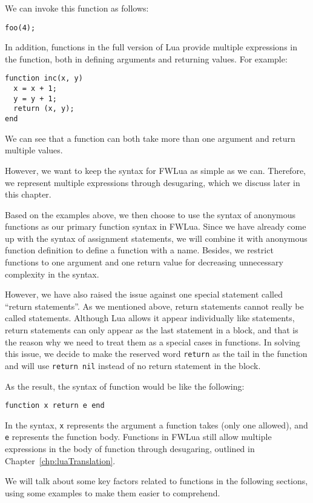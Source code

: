 We can invoke this function as follows:

\begin{verbatim}
foo(4);
\end{verbatim}

In addition, functions in the full version of Lua provide multiple expressions in the function, both in defining arguments and returning values. For example:

\begin{verbatim}
function inc(x, y)
  x = x + 1;
  y = y + 1;
  return (x, y);
end
\end{verbatim}

We can see that a function can both take more than one argument and return multiple values.

However, we want to keep the syntax for FWLua as simple as we can. Therefore, we represent multiple expressions through desugaring, which we discuss later in this chapter.

Based on the examples above, we then choose to use the syntax of anonymous functions as our primary function syntax in FWLua. Since we have already come up with the syntax of assignment statements, we will combine it with anonymous function definition to define a function with a name. Besides, we restrict functions to one argument and one return value for decreasing unnecessary complexity in the syntax.

However, we have also raised the issue against one special statement called ``return statements''. As we mentioned above, return statements cannot really be called statements. Although Lua allows it appear individually like statements, return statements can only appear as the last statement in a block, and that is the reason why we need to treat them as a special cases in functions. In solving this issue, we decide to make the reserved word {\tt return} as the tail in the function and will use {\tt return nil} instead of no return statement in the block.

As the result, the syntax of function would be like the following:
\begin{verbatim}
function x return e end
\end{verbatim}
In the syntax, {\tt x} represents the argument a function takes (only one allowed), and {\tt e} represents the function body. Functions in FWLua still allow multiple expressions in the body of function through desugaring, outlined in Chapter~\ref{chp:luaTranslation}.

We will talk about some key factors related to functions in the following sections, using some examples to make them easier to comprehend.

